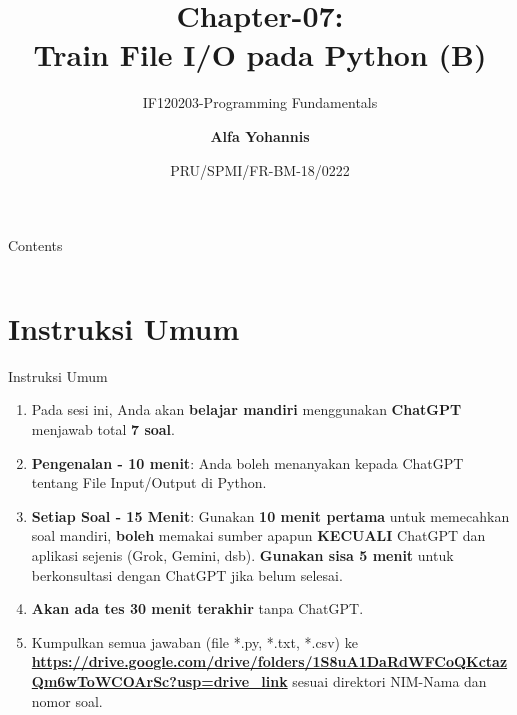 \documentclass[aspectratio=169, table]{beamer}
\subtitle{IF120203-Programming Fundamentals}
\title{Chapter-07:\\\LARGE{Train File I/O pada Python (B)\\}
\vspace{10pt}}
\date[Serial]{\scriptsize {PRU/SPMI/FR-BM-18/0222}}
\author[Pradita]{\small{\textbf{Alfa Yohannis}}}
\begin{document}
\frame{\titlepage}

\begin{frame}[fragile]{Contents}
\vspace{15pt}
\begin{columns}[t]
\begin{column}{.4\textwidth}
\tableofcontents[sections={1-4}]
\end{column}
\begin{column}{.6\textwidth}
\tableofcontents[sections={5-99}]
\end{column}
\end{columns}
\end{frame}

\section{Instruksi Umum}
\begin{frame}[fragile]{Instruksi Umum}
\vspace{20pt}
\begin{enumerate}
\item Pada sesi ini, Anda akan \textbf{belajar mandiri} menggunakan \textbf{ChatGPT} menjawab total \textbf{7 soal}.
\item \textbf{Pengenalan - 10 menit}: Anda boleh menanyakan kepada ChatGPT tentang File Input/Output di Python.
\item \textbf{Setiap Soal - 15 Menit}: Gunakan \textbf{10 menit pertama} untuk memecahkan soal mandiri, \textbf{boleh} memakai sumber apapun \textbf{KECUALI} ChatGPT dan aplikasi sejenis (Grok, Gemini, dsb). \textbf{Gunakan sisa 5 menit} untuk berkonsultasi dengan ChatGPT jika belum selesai. 
\item \textbf{Akan ada tes 30 menit terakhir} tanpa ChatGPT.
\item Kumpulkan semua jawaban (file *.py, *.txt, *.csv) ke \textcolor{blue}{\textbf{\url{https://drive.google.com/drive/folders/1S8uA1DaRdWFCoQKctazQm6wToWCOArSc?usp=drive_link}}} sesuai direktori NIM-Nama dan nomor soal. 
\end{enumerate}
\end{frame}
\end{document}
